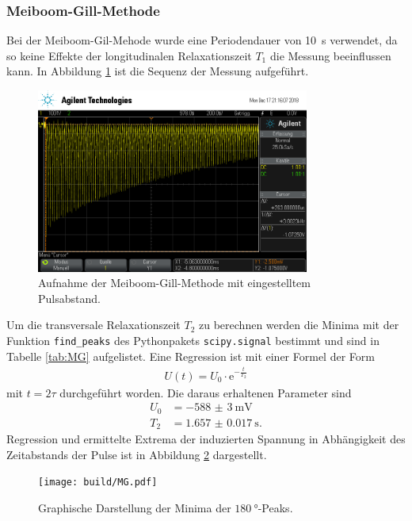 \subsubsection{Meiboom-Gill-Methode}
Bei der Meiboom-Gil-Mehode wurde eine Periodendauer von \SI{10}{\second}
verwendet, da so keine Effekte der longitudinalen Relaxationszeit $T_1$ die
Messung beeinflussen kann. In Abbildung \ref{fig:MG} ist die Sequenz der Messung
aufgeführt.
\begin{figure}[htb]
  \centering
  \includegraphics[width=0.8\textwidth]{rohdaten/mg_2.png}
  \caption{Aufnahme der Meiboom-Gill-Methode mit eingestelltem Pulsabstand.}
  \label{fig:MG}
\end{figure}

Um die transversale Relaxationszeit $T_2$ zu berechnen werden die Minima mit der
Funktion \texttt{find\_peaks} des Pythonpakets \texttt{scipy.signal} bestimmt und
sind in Tabelle \ref{tab:MG} aufgelistet.
Eine Regression ist mit einer Formel
der Form
\begin{align*}
  U(t) = U_0 \cdot \text{e}^{-\frac{t}{T_2}}
\end{align*}
mit $t = 2\tau$ durchgeführt worden. Die daraus erhaltenen Parameter sind
\begin{align*}
  U_0 &= -\SI{588(3)}{\milli\volt} \\
  T_2 &= \SI{1.657(17)}{\second}.
\end{align*}
Regression und ermittelte Extrema der induzierten Spannung in Abhängigkeit des
Zeitabstands der Pulse ist in Abbildung \ref{plt:MG} dargestellt.
\begin{figure}[htb]
  \centering
  \texttt{[image: build/MG.pdf]}
  \caption{Graphische Darstellung der Minima der $\SI{180}{\degree}$-Peaks.}
  \label{plt:MG}
\end{figure}
\FloatBarrier

